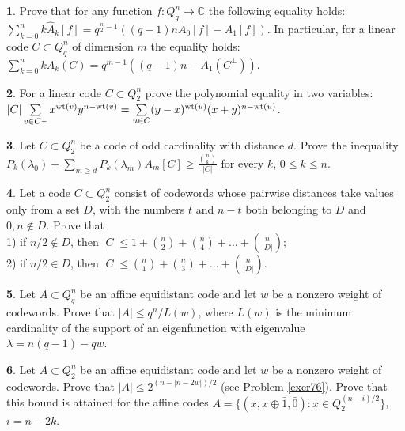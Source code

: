 \documentclass[11pt]{article}
\theoremstyle{definition}
\newtheorem{exercise}{\quad}
\newcommand{\wt}{{\rm wt}}
\begin{document}
{{{\begin{exercise}
Prove that for any function $f:Q^n_q\rightarrow \mathbb{C}$ the following equality holds:
$\sum\limits_{k=0}^nk\widehat{A}_k[f]=q^{\frac{n}{2}-1}((q-1)nA_0[f]-A_1[f])$.
In particular, for a linear code $C\subset Q^n_q$ of dimension $m$ the equality holds:\\
$\sum\limits_{k=0}^nk{A}_k(C)=q^{{m}-1}((q-1)n-A_1({C^\perp}))$.
\end{exercise}

\begin{exercise}
For a linear code $C\subset Q^n_2$ prove the polynomial equality in two variables:\\
$|C|\sum\limits_{v\in {C^\perp}}x^{\wt{(v)}}y^{n-\wt{(v)}}=\sum\limits_{u\in {C}}(y-x)^{\wt{(u)}}(x+y)^{n-\wt{(u)}}$.
\end{exercise}


\begin{exercise}
Let $C\subset Q^n_2$ be a code of odd cardinality with distance $d$. Prove the inequality $P_k(\lambda_0)+\sum\limits_{m\geq d} P_k(\lambda_m)A_m[C]\geq \frac{{n\choose k}}{|C|}$ for every $k$, $0\leq k\leq n$.
\end{exercise}

\begin{exercise}
Let a code $C\subset Q^n_2$ consist of codewords whose pairwise distances take values only from a set $D$, with the numbers $t$ and $n-t$ both belonging  to $D$  and $0,n\not\in D$. Prove that\\
1) if $n/2\not \in D$, then $|C|\leq 1+{n\choose 2}+{n\choose 4}+\dots+{n\choose |D|}$;\\
2) if $n/2\in D$, then $|C|\leq {n\choose 1}+{n\choose 3}+\dots+{n\choose |D|}$.
\end{exercise}

\begin{exercise}
Let $A\subset Q_q^n$ be an affine  equidistant code and let $w$ be a nonzero weight of codewords. Prove that $|A|\leq q^n/L(w)$, where $L(w)$ is the minimum cardinality of the support of an eigenfunction with eigenvalue $\lambda=n(q-1)-qw$.
\end{exercise}

\begin{exercise}
Let $A\subset Q_2^n$ be an affine  equidistant code and let $w$ be a nonzero weight of codewords. Prove that $|A|\leq 2^{(n-|n-2w|)/2}$ (see Problem \ref{exer76}). Prove that this bound is attained for the affine codes $A=\{(x,x\oplus \bar 1,\bar 0) : x\in Q_2^{(n-i)/2}\}$, $i=n-2k$.
\end{exercise}

}}}
\end{document}
